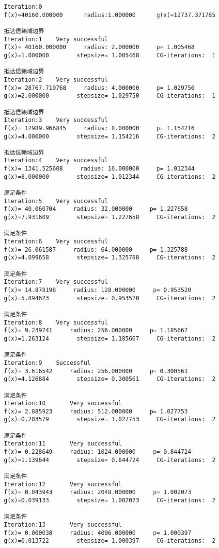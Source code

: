 \begin{lstlisting}
Iteration:0
f(x)=40160.000000      radius:1.000000      g(x)=12737.371785

抵达信赖域边界
Iteration:1	   Very successful
f(x)= 40160.000000     radius: 2.000000     p= 1.005468
g(x)=1.000000        stepsize= 1.005468     CG-iterations:  1 

抵达信赖域边界
Iteration:2	   Very successful
f(x)= 28767.719768     radius: 4.000000     p= 1.029750
g(x)=2.000000        stepsize= 1.029750     CG-iterations:  1 

抵达信赖域边界
Iteration:3	   Very successful
f(x)= 12989.966845     radius: 8.000000     p= 1.154216
g(x)=4.000000        stepsize= 1.154216     CG-iterations:  2 

抵达信赖域边界
Iteration:4	   Very successful
f(x)= 1341.525608     radius: 16.000000     p= 1.012344
g(x)=8.000000        stepsize= 1.012344     CG-iterations:  2 

满足条件
Iteration:5	   Very successful
f(x)= 40.060704     radius: 32.000000     p= 1.227658
g(x)=7.931609        stepsize= 1.227658     CG-iterations:  2 

满足条件
Iteration:6	   Very successful
f(x)= 26.061587     radius: 64.000000     p= 1.325788
g(x)=4.099658        stepsize= 1.325788     CG-iterations:  2 

满足条件
Iteration:7	   Very successful
f(x)= 14.878198     radius: 128.000000     p= 0.953520
g(x)=5.894623        stepsize= 0.953520     CG-iterations:  2 

满足条件
Iteration:8	   Very successful
f(x)= 9.239741     radius: 256.000000     p= 1.185667
g(x)=1.263124        stepsize= 1.185667     CG-iterations:  2 

满足条件
Iteration:9	   Successful
f(x)= 3.616542     radius: 256.000000     p= 0.300561
g(x)=4.126884        stepsize= 0.300561     CG-iterations:  2 

满足条件
Iteration:10	   Very successful
f(x)= 2.885923     radius: 512.000000     p= 1.027753
g(x)=0.203579        stepsize= 1.027753     CG-iterations:  2 

满足条件
Iteration:11	   Very successful
f(x)= 0.228649     radius: 1024.000000     p= 0.844724
g(x)=1.139644        stepsize= 0.844724     CG-iterations:  2 

满足条件
Iteration:12	   Very successful
f(x)= 0.043943     radius: 2048.000000     p= 1.002073
g(x)=0.039133        stepsize= 1.002073     CG-iterations:  2 

满足条件
Iteration:13	   Very successful
f(x)= 0.000038     radius: 4096.000000     p= 1.000397
g(x)=0.013722        stepsize= 1.000397     CG-iterations:  2 


\end{lstlisting}
